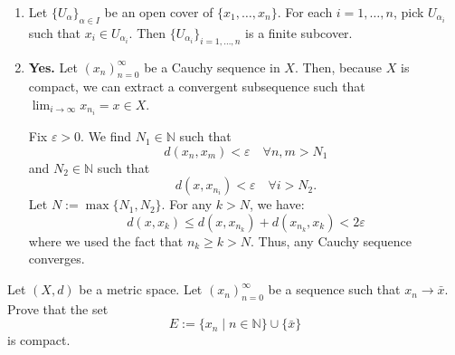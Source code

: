\begin{exercisesolution}
\begin{enumerate}[label=\textbf{(\alph*)}]
  \item Let $\{U_\alpha\}_{\alpha \in I}$ be an open cover of $\{x_1, \dots, x_n\}$. For each
    $i = 1, \dots, n$, pick $U_{\alpha_i}$ such that $x_i \in U_{\alpha_i}$. Then
    $\{U_{\alpha_i}\}_{i=1,\dots,n}$ is a finite subcover.
  \item \textbf{Yes.} Let $(x_n)_{n=0}^{\infty}$ be a Cauchy sequence in $X$. Then, because $X$ is
    compact, we can extract a convergent subsequence such that $\lim_{i \to \infty} x_{n_i} = x \in X$.

    Fix $\varepsilon > 0$. We find $N_1 \in \mathbb{N}$ such that
    \[d(x_n, x_m) < \varepsilon \quad \forall n, m > N_1\]
    and $N_2 \in \mathbb{N}$ such that
    \[d(x, x_{n_i}) < \varepsilon \quad \forall i > N_2.\]
    Let $N := \max\{N_1, N_2\}$. For any $k > N$, we have:
    \[d(x, x_k) \leq d(x, x_{n_k}) + d(x_{n_k}, x_k) < 2\varepsilon\]
    where we used the fact that $n_k \geq k > N$. Thus, any Cauchy sequence converges.
\end{enumerate}
\end{exercisesolution}


\begin{exercise}
\label{ex:convergent_sequence_compact}
Let $(X,d)$ be a metric space. Let $(x_n)_{n=0}^\infty$ be a sequence such that $x_n \to \bar{x}$. Prove that the set
\[E := \{x_n \mid n \in \mathbb{N}\} \cup \{\bar{x}\}\]
is compact.
\end{exercise}

